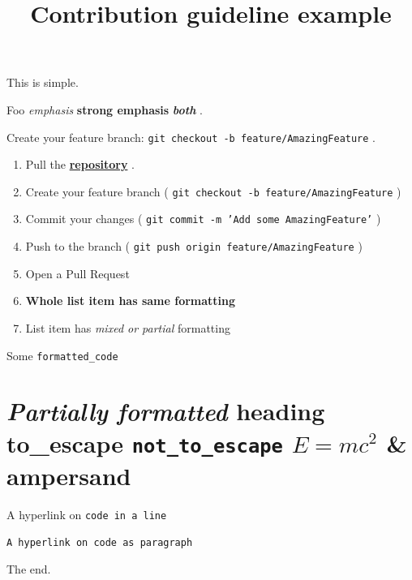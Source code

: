 \documentclass[11pt,a4paper]{article}
\title{Contribution guideline example}
\begin{document}
\maketitle

This is simple.

Foo \textit{emphasis} \textbf{strong emphasis} \textit{\textbf{both}} .

Create your feature branch: \texttt{git checkout -b feature/AmazingFeature} .

\begin{enumerate}
\item Pull the \href{https://github.com/docling-project/docling}{\textbf{repository}} .
\item Create your feature branch ( \texttt{git checkout -b feature/AmazingFeature} )
\item Commit your changes ( \texttt{git commit -m 'Add some AmazingFeature'} )
\item Push to the branch ( \texttt{git push origin feature/AmazingFeature} )
\item Open a Pull Request
\item \textbf{Whole list item has same formatting}
\item List item has \textit{mixed or partial} formatting
\end{enumerate}

Some \texttt{formatted\_code}

\section{\textit{Partially formatted} heading to\_escape \texttt{not\_to\_escape} $E=mc^2$ \& ampersand}

A hyperlink on \texttt{code in a line}

\begin{verbatim}
A hyperlink on code as paragraph
\end{verbatim}

The end.
\end{document}
